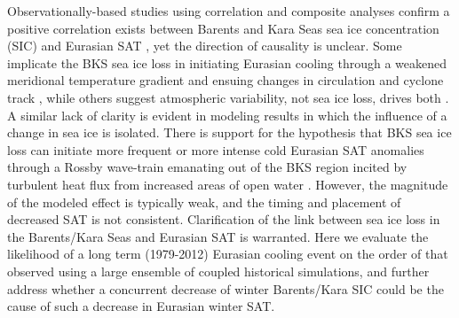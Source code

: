\documentclass{nature}
\begin{document}


Observationally-based studies using correlation and composite analyses confirm a positive correlation exists between Barents and Kara Seas sea ice concentration (SIC) and Eurasian SAT \cite{inoue12,outten12,sorokina15}, yet the direction of causality is unclear. Some implicate the BKS sea ice loss in initiating Eurasian cooling through a weakened meridional temperature gradient and ensuing changes in circulation and cyclone track \cite{inoue12,outten12}, while others suggest atmospheric variability, not sea ice loss, drives both \cite{sorokina15}. A similar lack of clarity is evident in modeling results in which the influence of a change in sea ice is isolated. There is support for the hypothesis that BKS sea ice loss can initiate more frequent or more intense cold Eurasian SAT anomalies through a Rossby wave-train emanating out of the BKS region incited by turbulent heat flux from increased areas of open water \cite{honda09,petoukhov10,mori14,kim14,peings14,gerber14}. However, the magnitude of the modeled effect is typically weak, and the timing and placement of decreased SAT is not consistent. Clarification of the link between sea ice loss in the Barents/Kara Seas and Eurasian SAT is warranted. Here we evaluate the likelihood of a long term (1979-2012) Eurasian cooling event on the order of that observed using a large ensemble of coupled historical simulations, and further address whether a concurrent decrease of winter Barents/Kara SIC could be the cause of such a decrease in Eurasian winter SAT. %
\end{document}
